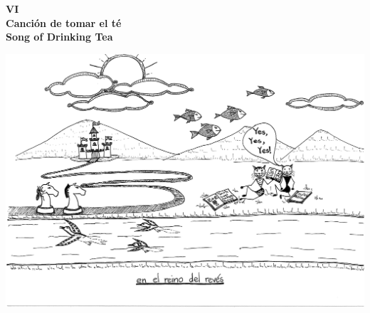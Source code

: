 \documentclass[11pt]{article}
\begin{document}
\clearpage

\begin{center}
\large\textbf{
VI\\
Canción de tomar el té\\
Song of Drinking Tea
}
\end{center}

\begin{center}
\includegraphics[page=6,scale=0.5,clip=true,trim = 0in 3mm 0in 0in]{20150406235752619.pdf}
\end{center}
\end{document}
